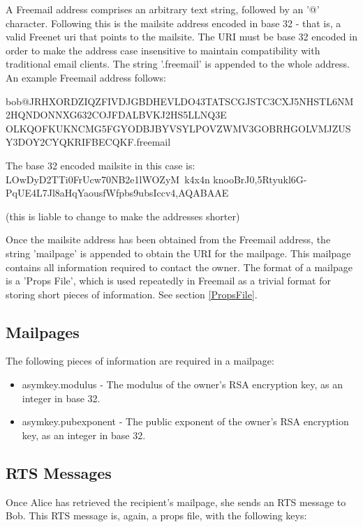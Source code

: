 \documentclass[12pt,a4paper]{article}
\begin{document}
A Freemail address comprises an arbitrary text string, followed by an '@' character. Following this
is the mailsite address encoded in base 32 - that is, a valid Freenet uri that points to the
mailsite. The URI must be base 32 encoded in order to make the address case insensitive to maintain
compatibility with traditional email clients. The string '.freemail' is appended to the whole
address. An example Freemail address follows:

bob@JRHXORDZIQZFIVDJ\-GBDHEVLDO43TATSCGJST\-C3CXJ5NHSTL6NM2HQ\-NDONNXG632COJFD\-ALBVKJ2HS5LLNQ3E\-
OLKQOFKUKNCMG5F\-GYODBJBY\-VSYLPOVZ\-WMV3GOBRHGOLVMJ\-ZUSY3DOY2CY\-QKRIFBECQKF.freemail

The base 32 encoded mailsite in this case is: LOwDyD2TTi0FrUcw70N\-B2e1lWOZyM~k4x4n\-
knooBrJ0,5Rtyu\-kl6G-PqUE4L7\-Jl8aHqYaous\-fWfpbs9ubsI\-ccv4,AQABAAE

(this is liable to change to make the addresses shorter)

Once the mailsite address has been obtained from the Freemail address, the string 'mailpage' is
appended to obtain the URI for the mailpage. This mailpage contains all information required to
contact the owner. The format of a mailpage is a 'Props File', which is used repeatedly in Freemail
as a trivial format for storing short pieces of information. See section \ref{PropsFile}.

\subsection{Mailpages}
The following pieces of information are required in a mailpage:

\begin{itemize}
\item asymkey.modulus - The modulus of the owner's RSA encryption key, as an integer in base 32.
\item asymkey.pubexponent - The public exponent of the owner's RSA encryption key, as an integer in
	base 32.
\end{itemize}

\subsection{RTS Messages}
Once Alice has retrieved the recipient's mailpage, she sends an RTS message to Bob. This RTS message
is, again, a props file, with the following keys:
\end{document}
